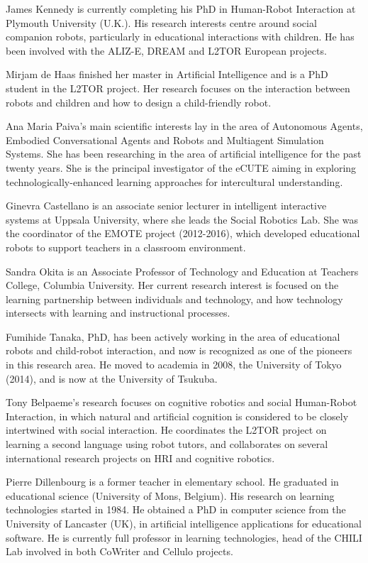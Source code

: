 \documentclass{sig-alternate-05-2015}
\begin{document}
James Kennedy is currently completing his PhD in Human-Robot Interaction at Plymouth University (U.K.). His research interests centre around social companion robots, particularly in educational interactions with children. He has been involved with the ALIZ-E, DREAM and L2TOR European projects.

Mirjam de Haas finished her master in Artificial Intelligence and is a PhD student in the L2TOR project. Her research focuses on the interaction between robots and children and how to design a child-friendly robot.

Ana Maria Paiva's main scientific interests lay in the area of Autonomous Agents, Embodied Conversational Agents and Robots and Multiagent Simulation Systems. She has been researching in the area of artificial intelligence for the past twenty years. She is the principal investigator of the eCUTE aiming in exploring technologically-enhanced learning approaches for intercultural understanding.

Ginevra Castellano is an associate senior lecturer in intelligent interactive systems at Uppsala University, where she leads the Social Robotics Lab. She was the coordinator of the EMOTE project (2012-2016), which developed educational robots to support teachers in a classroom environment.

Sandra Okita is an Associate Professor of Technology and Education at Teachers College, Columbia University. Her current research interest is focused on the learning partnership between individuals and technology, and how technology intersects with learning and instructional processes.

Fumihide Tanaka, PhD,  has been actively working in the area of educational robots and child-robot interaction, and now is recognized as one of the pioneers in this research area. He moved to academia in 2008, the University of Tokyo (2014), and is now at the University of Tsukuba.

Tony Belpaeme's research focuses on cognitive robotics and social Human-Robot Interaction, in which natural and artificial cognition is considered to be closely intertwined with social interaction. He coordinates the L2TOR project on learning a second language using robot tutors, and collaborates on several international research projects on HRI and cognitive robotics.

Pierre Dillenbourg is a former teacher in elementary school. He graduated in educational science (University of Mons, Belgium). His research on learning technologies started in 1984. He obtained a PhD in computer science from the University of Lancaster (UK), in artificial intelligence applications for educational software. He is currently full professor in learning technologies, head of the CHILI Lab involved in both CoWriter and Cellulo projects.
\end{document}
